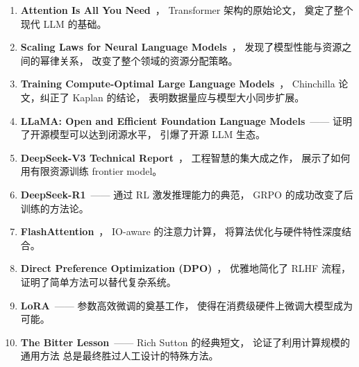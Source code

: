 \begin{enumerate}[noitemsep]
  \item \textbf{Attention Is All You Need}~\cite{vaswani2017attention}，
        Transformer 架构的原始论文，
        奠定了整个现代 LLM 的基础。
  \item \textbf{Scaling Laws for Neural Language Models}~\cite{kaplan2020scaling}，
        发现了模型性能与资源之间的幂律关系，
        改变了整个领域的资源分配策略。
  \item \textbf{Training Compute-Optimal Large Language Models}~\cite{hoffmann2022chinchilla}，
        Chinchilla 论文，纠正了 Kaplan 的结论，
        表明数据量应与模型大小同步扩展。
  \item \textbf{LLaMA: Open and Efficient Foundation Language Models}~\cite{touvron2023llama}——
        证明了开源模型可以达到闭源水平，
        引爆了开源 LLM 生态。
  \item \textbf{DeepSeek-V3 Technical Report}~\cite{deepseekv3}，
        工程智慧的集大成之作，
        展示了如何用有限资源训练 frontier model。
  \item \textbf{DeepSeek-R1}~\cite{deepseekr1}——
        通过 RL 激发推理能力的典范，
        GRPO 的成功改变了后训练的方法论。
  \item \textbf{FlashAttention}~\cite{dao2022flashattention}，
        IO-aware 的注意力计算，
        将算法优化与硬件特性深度结合。
  \item \textbf{Direct Preference Optimization (DPO)}~\cite{rafailov2023dpo}，
        优雅地简化了 RLHF 流程，
        证明了简单方法可以替代复杂系统。
  \item \textbf{LoRA}~\cite{hu2021lora}——
        参数高效微调的奠基工作，
        使得在消费级硬件上微调大模型成为可能。
  \item \textbf{The Bitter Lesson}~\cite{sutton2019bitterlesson}——
        Rich Sutton 的经典短文，
        论证了利用计算规模的通用方法
        总是最终胜过人工设计的特殊方法。
\end{enumerate}


